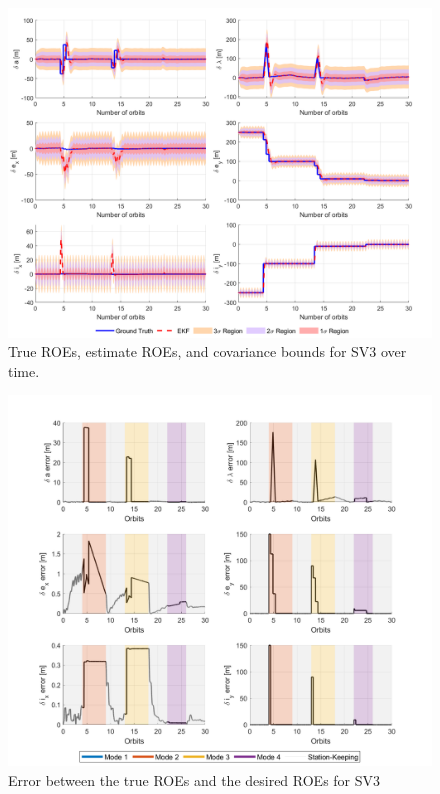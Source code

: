 \begin{figure}[H]
    \centering
    \includegraphics[width=0.7\linewidth]{sim/figures/PS9/ROE_over_time_SV3_comparison.png}
    \caption{True ROEs, estimate ROEs, and covariance bounds for SV3 over time.}
    \label{fig:sv3_ekf_comparison_ps9_final_summary}
\end{figure}

\begin{figure}[H]
    \centering
    \includegraphics[width=0.7\linewidth]{sim/figures/PS9/ROE_error_over_time_modes_SV3.png}
    \caption{Error between the true ROEs and the desired ROEs for SV3}
    \label{fig:roe_error_control_sv3_summary}
\end{figure}


